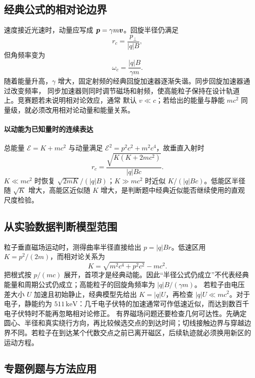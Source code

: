 {\subsection{经典公式的相对论边界}


速度接近光速时，动量应写成 $\bm{p}=\gamma m\bm{v}$。回旋半径仍满足
\begin{equation}
 r_c=\frac{p_\perp}{|q|B},
\end{equation}
但角频率变为
\begin{equation}
 \omega_c=\frac{|q|B}{\gamma m}.
\end{equation}
随着能量升高，$\gamma$ 增大，固定射频的经典回旋加速器逐渐失谐。同步回旋加速器通过改变频率，
同步加速器则同时调节磁场和射频，使高能粒子保持在设计轨道上。竞赛题若未说明相对论效应，通常
默认 $v\ll c$；若给出的能量与静能 $mc^2$ 同量级，就必须改用相对论动量和能量关系。

\paragraph{以动能为已知量时的连续表达}
总能量 $\mathcal E=K+mc^2$ 与动量满足 $\mathcal E^2=p^2c^2+m^2c^4$，故垂直入射时
\[
 r_c=\frac{\sqrt{K(K+2mc^2)}}{|q|Bc}.
\]
$K\ll mc^2$ 时恢复 $\sqrt{2mK}/(|q|B)$；$K\gg mc^2$ 时近似 $K/(|q|Bc)$。低能区半径随 $\sqrt K$ 增大，高能区近似随 $K$ 增大，是判断题中经典近似能否继续使用的直观尺度检验。



\subsection{从实验数据判断模型范围}
粒子垂直磁场运动时，测得曲率半径直接给出 $p=|q|Br$。低速区用 $K=p^2/(2m)$，而相对论关系为
\[
 K=\sqrt{m^2c^4+p^2c^2}-mc^2.
\]
把根式按 $p/(mc)$ 展开，首项才是经典动能。因此“半径公式仍成立”不代表经典能量和周期公式仍成立；高能粒子的回旋角频率为 $|q|B/(\gamma m)$。
若粒子由电压差大小 $U$ 加速且初始静止，经典模型先给出 $K=|q|U$，再检查 $|q|U\ll mc^2$。对于电子，静能约为 $511\,\mathrm{keV}$：几千电子伏特的加速通常可作低速近似，而达到数百千电子伏特时不能再忽略相对论修正。
有界磁场问题还要检查几何可达性。先确定圆心、半径和真实绕行方向，再比较候选交点的到达时间；切线接触边界与穿越边界不同。若粒子在到达某个代数交点之前已离开磁区，后续轨迹就必须换用新区的运动方程。


\subsection{专题例题与方法应用}

}
